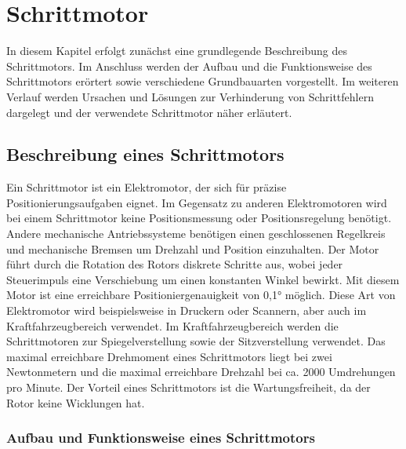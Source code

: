 %
%
%

\chapter{Schrittmotor}

In diesem Kapitel erfolgt zunächst eine grundlegende Beschreibung des Schrittmotors. Im Anschluss werden der Aufbau und die Funktionsweise des Schrittmotors erörtert sowie verschiedene Grundbauarten vorgestellt. Im weiteren Verlauf werden Ursachen und Lösungen zur Verhinderung von Schrittfehlern dargelegt und der verwendete Schrittmotor näher erläutert.

\section{Beschreibung eines Schrittmotors}

Ein Schrittmotor ist ein Elektromotor, der sich für präzise Positionierungsaufgaben eignet. Im Gegensatz zu anderen Elektromotoren wird bei einem Schrittmotor keine Positionsmessung oder Positionsregelung benötigt. Andere mechanische Antriebssysteme benötigen einen geschlossenen Regelkreis und mechanische Bremsen um Drehzahl und Position einzuhalten. Der Motor führt durch die Rotation des Rotors diskrete Schritte aus, wobei jeder Steuerimpuls eine Verschiebung um einen konstanten Winkel bewirkt. Mit diesem Motor ist eine erreichbare Positioniergenauigkeit von 0,1° möglich. Diese Art von Elektromotor wird beispielsweise in Druckern oder Scannern, aber auch im Kraftfahrzeugbereich verwendet. Im Kraftfahrzeugbereich werden die Schrittmotoren zur Spiegelverstellung sowie der Sitzverstellung verwendet. Das maximal erreichbare Drehmoment eines Schrittmotors liegt bei zwei Newtonmetern und die maximal erreichbare Drehzahl bei ca. 2000 Umdrehungen pro Minute. Der Vorteil eines Schrittmotors ist die Wartungsfreiheit, da der Rotor keine Wicklungen hat. \cite{Babiel.2023}\cite{Hagl.2021}\cite{Bernstein.2018}\cite{Schroder.2021}

\subsection{Aufbau und Funktionsweise eines Schrittmotors}

